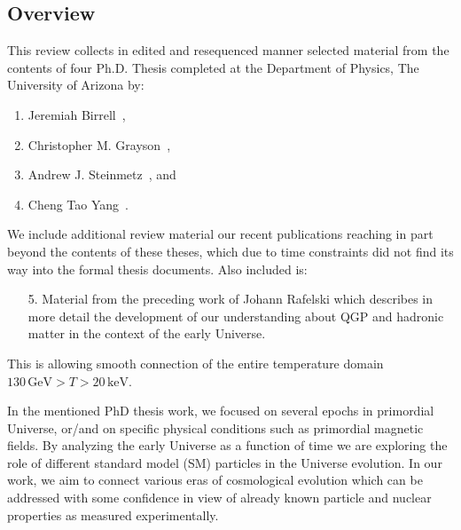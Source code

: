 \subsection{Overview}
\label{sec:context}
This review collects  in edited and resequenced manner selected material from the contents of four Ph.D. Thesis completed at the Department of Physics, The University of Arizona by:
\begin{enumerate}
\item Jeremiah Birrell~\cite{Birrell:2014ona},
\item Christopher M. Grayson~\cite{Grayson:2024okq},
\item Andrew J. Steinmetz~\cite{Steinmetz:2023ucp}, and
\item Cheng Tao Yang~\cite{Yang:2024ret}.
\end{enumerate}
We include additional review material our recent publications reaching in part beyond the contents of these theses, which due to time constraints did not find its way into the formal thesis documents. Also included is:
\begin{enumerate}
\item[5.] Material from the preceding work of Johann Rafelski which describes in more detail the development of our understanding about QGP and hadronic matter in the context of the early Universe.
\end{enumerate}
This is allowing smooth connection of the entire temperature domain $130\,\mathrm{GeV}>T>20\,\mathrm{keV}$.

In the mentioned PhD thesis work, we focused on several epochs in primordial Universe, or/and on specific physical conditions such as primordial magnetic fields. By analyzing the early Universe as a function of time we are exploring the role of different standard model (SM) particles in the Universe evolution. In our work, we aim to connect various eras of cosmological evolution which can be addressed with some confidence in view of already known particle and nuclear properties as measured experimentally.



